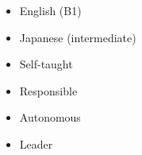 %
%
%

\twocolumnsection
{
\vspace{1em}
\begin{itemize}
    \item English (B1)
    \item Japanese (intermediate)
\end{itemize}
}
{
\vspace{1em}
\begin{itemize}
    \item Self-taught
    \item Responsible                   
    \item Autonomous
    \item Leader
\end{itemize}
}